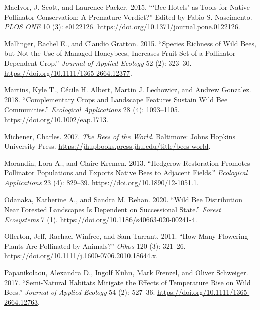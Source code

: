 \documentclass[smallextended]{svjour3}       %
\newlength{\cslhangindent}
\newenvironment{CSLReferences}[2] %
 {%
  \setlength{\parindent}{0pt}
  \ifodd #1 \everypar{\setlength{\hangindent}{\cslhangindent}}\ignorespaces\fi
  \ifnum #2 > 0
  \setlength{\parskip}{#2\baselineskip}
  \fi
 }%
 {}
\begin{document}
\begin{CSLReferences}{1}{0}
\leavevmode{}%
MacIvor, J. Scott, and Laurence Packer. 2015. {``{`Bee Hotels'} as Tools
for Native Pollinator Conservation: A Premature Verdict?''} Edited by
Fabio S. Nascimento. \emph{{PLOS} {ONE}} 10 (3): e0122126.
\url{https://doi.org/10.1371/journal.pone.0122126}.

\leavevmode{}%
Mallinger, Rachel E., and Claudio Gratton. 2015. {``Species Richness of
Wild Bees, but Not the Use of Managed Honeybees, Increases Fruit Set of
a Pollinator-Dependent Crop.''} \emph{Journal of Applied Ecology} 52
(2): 323--30. \url{https://doi.org/10.1111/1365-2664.12377}.

\leavevmode{}%
Martins, Kyle T., Cécile H. Albert, Martin J. Lechowicz, and Andrew
Gonzalez. 2018. {``Complementary Crops and Landscape Features Sustain
Wild Bee Communities.''} \emph{Ecological Applications} 28 (4):
1093--1105. \url{https://doi.org/10.1002/eap.1713}.

\leavevmode{}%
Michener, Charles. 2007. \emph{The Bees of the World}. Baltimore: Johns
Hopkins University Press.
\url{https://jhupbooks.press.jhu.edu/title/bees-world}.

\leavevmode{}%
Morandin, Lora A., and Claire Kremen. 2013. {``Hedgerow Restoration
Promotes Pollinator Populations and Exports Native Bees to Adjacent
Fields.''} \emph{Ecological Applications} 23 (4): 829--39.
\url{https://doi.org/10.1890/12-1051.1}.

\leavevmode{}%
Odanaka, Katherine A., and Sandra M. Rehan. 2020. {``Wild Bee
Distribution Near Forested Landscapes Is Dependent on Successional
State.''} \emph{Forest Ecosystems} 7 (1).
\url{https://doi.org/10.1186/s40663-020-00241-4}.

\leavevmode{}%
Ollerton, Jeff, Rachael Winfree, and Sam Tarrant. 2011. {``How Many
Flowering Plants Are Pollinated by Animals?''} \emph{Oikos} 120 (3):
321--26. \url{https://doi.org/10.1111/j.1600-0706.2010.18644.x}.

\leavevmode{}%
Papanikolaou, Alexandra D., Ingolf Kühn, Mark Frenzel, and Oliver
Schweiger. 2017. {``Semi-Natural Habitats Mitigate the Effects of
Temperature Rise on Wild Bees.''} \emph{Journal of Applied Ecology} 54
(2): 527--36. \url{https://doi.org/10.1111/1365-2664.12763}.


\end{CSLReferences}
\end{document}
